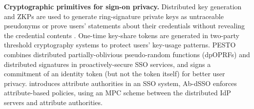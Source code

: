 \noindent\textbf{Cryptographic primitives for sign-on privacy.}
Distributed key generation and ZKPs are used to generate ring-signature private keys as untraceable pseudonyms \cite{crypto-book} or prove users' statements about their credentials without revealing the credential contents \cite{zklaim}.
One-time key-share tokens \cite{tandem} are generated in two-party threshold cryptography systems to protect users' key-usage patterns.
PESTO \cite{pesto} combines distributed partially-oblivious pseudo-random functions (dpOPRFs) and distributed signatures in proactively-secure SSO services, and signs a commitment of an identity token (but not the token itself) for better user privacy.
introduces attribute authorities in an SSO system,
Ab-dSSO \cite{AttriB-SSO} enforces attribute-based policies,
     using an MPC scheme between the distributed IdP servers and attribute authorities.













